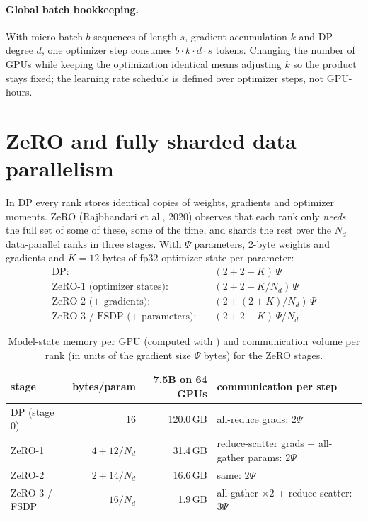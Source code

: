 \paragraph{Global batch bookkeeping.} With micro-batch $b$ sequences of length $s$, gradient
accumulation $k$ and DP degree $d$, one optimizer step consumes $b\cdot k\cdot d\cdot s$ tokens.
Changing the number of GPUs while keeping the optimization identical means adjusting $k$ so the
product stays fixed; the learning rate schedule is defined over optimizer steps, not GPU-hours.

\section{ZeRO and fully sharded data parallelism}\label{sec:dist:zero}

In DP every rank stores identical copies of weights, gradients and optimizer moments. ZeRO
(Rajbhandari et al., 2020) observes that each rank only \emph{needs} the full set of some of
these, some of the time, and shards the rest over the $N_d$ data-parallel ranks in three
stages. With $\Psi$ parameters, 2-byte weights and gradients and $K=12$ bytes of fp32
optimizer state per parameter:
\begin{align}
\text{DP:}\quad & (2+2+K)\,\Psi \\
\text{ZeRO-1 (optimizer states):}\quad & (2+2+K/N_d)\,\Psi \\
\text{ZeRO-2 (+ gradients):}\quad & (2+(2+K)/N_d)\,\Psi \\
\text{ZeRO-3 / FSDP (+ parameters):}\quad & (2+2+K)\,\Psi/N_d
\end{align}

\begin{table}[t]
\centering\small
\begin{tabular}{lrrl}
\toprule
stage & bytes/param & 7.5B on 64 GPUs & communication per step \\
\midrule
DP (stage 0) & 16 & 120.0\,GB & all-reduce grads: $2\Psi$ \\
ZeRO-1 & $4 + 12/N_d$ & 31.4\,GB & reduce-scatter grads + all-gather params: $2\Psi$ \\
ZeRO-2 & $2 + 14/N_d$ & 16.6\,GB & same: $2\Psi$ \\
ZeRO-3 / FSDP & $16/N_d$ & 1.9\,GB & all-gather $\times2$ + reduce-scatter: $3\Psi$ \\
\bottomrule
\end{tabular}
\caption{Model-state memory per GPU (computed with )
and communication volume per rank (in units of the gradient size $\Psi$ bytes) for the ZeRO
stages.}
\label{tab:dist:zero}
\end{table}

